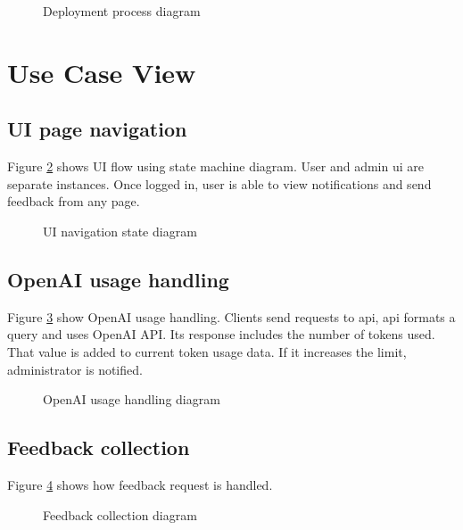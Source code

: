 \documentclass[
    english, %
]{VUMIFPSkursinis}
\begin{document}
\begin{figure}[ht]
    \centering
    
    \caption{Deployment process diagram}
    \label{deployment-process-diagram}
\end{figure}

\section{Use Case View}

\subsection{UI page navigation}

Figure \ref{uistate} shows UI flow using state machine diagram. User and admin ui are separate instances. Once logged in, user is able to view notifications and send feedback from any page.

\begin{figure}[ht]
    \centering
    
    \caption{UI navigation state diagram}
    \label{uistate}
\end{figure}

\subsection{OpenAI usage handling}

Figure \ref{openai-use-case} show OpenAI usage handling. Clients send requests to api, api formats a query and uses OpenAI API. Its response includes the number of tokens used. That value is added to current token usage data. If it increases the limit, administrator is notified.

\begin{figure}[ht]
    \centering
    
    \caption{OpenAI usage handling diagram}
    \label{openai-use-case}
\end{figure}

\subsection{Feedback collection}

Figure \ref{feedback-use-case} shows how feedback request is handled.

\begin{figure}[ht]
    \centering
    
    \caption{Feedback collection diagram}
    \label{feedback-use-case}
\end{figure}
\end{document}

